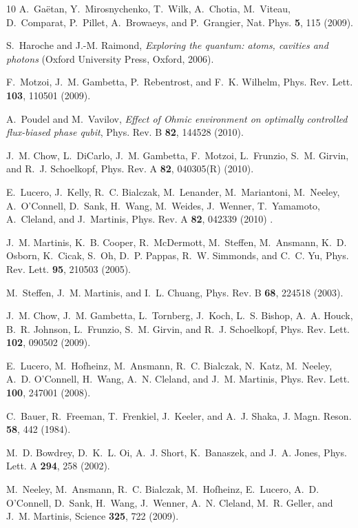 \documentclass[pra,twocolumn,floatfix,superscriptaddress,eqsecnum]{revtex4-1}
\begin{document}
\begin{thebibliography}{10}
A.~Ga\"etan, Y.~Mirosnychenko, T.~Wilk, A.~Chotia, M.~Viteau, D.~Comparat,
  P.~Pillet, A.~Browaeys, and P.~Grangier, Nat. Phys. \textbf{5}, 115 (2009).

S.~Haroche and J.-M. Raimond, \emph{Exploring the quantum: atoms, cavities and
  photons} (Oxford University Press, Oxford, 2006).

F.~Motzoi, J.~M. Gambetta, P.~Rebentrost, and F.~K. Wilhelm, Phys. Rev. Lett.
  \textbf{103}, 110501 (2009).

A.~Poudel and M.~Vavilov, \emph{Effect of Ohmic environment on optimally
  controlled flux-biased phase qubit}, Phys. Rev. B \textbf{82}, 144528 (2010).

J.~M. Chow, L.~DiCarlo, J.~M. Gambetta, F.~Motzoi, L.~Frunzio, S.~M. Girvin,
  and R.~J. Schoelkopf, Phys. Rev. A \textbf{82}, 040305(R) (2010).

E.~Lucero, J.~Kelly, R.~C. Bialczak, M.~Lenander, M.~Mariantoni, M.~Neeley,
  A.~O'Connell, D.~Sank, H.~Wang, M.~Weides, J.~Wenner, T.~Yamamoto,
  A.~Cleland, and J.~Martinis, Phys. Rev. A \textbf{82}, 042339 (2010) .

J.~M. Martinis, K.~B. Cooper, R.~McDermott, M.~Steffen, M.~Ansmann, K.~D.
  Osborn, K.~Cicak, S.~Oh, D.~P. Pappas, R.~W. Simmonds, and C.~C. Yu, Phys.
  Rev. Lett. \textbf{95}, 210503 (2005).

M.~Steffen, J.~M. Martinis, and I.~L. Chuang, Phys. Rev. B \textbf{68}, 224518
  (2003).

J.~M. Chow, J.~M. Gambetta, L.~Tornberg, J.~Koch, L.~S. Bishop, A.~A. Houck,
  B.~R. Johnson, L.~Frunzio, S.~M. Girvin, and R.~J. Schoelkopf, Phys. Rev.
  Lett. \textbf{102}, 090502 (2009).

E.~Lucero, M.~Hofheinz, M.~Ansmann, R.~C. Bialczak, N.~Katz, M.~Neeley, A.~D.
  O'Connell, H.~Wang, A.~N. Cleland, and J.~M. Martinis, Phys. Rev. Lett.
  \textbf{100}, 247001 (2008).

C.~Bauer, R.~Freeman, T.~Frenkiel, J.~Keeler, and A.~J. Shaka, J. Magn. Reson.
  \textbf{58}, 442 (1984).

M.~D. Bowdrey, D.~K.~L. Oi, A.~J. Short, K.~Banaszek, and J.~A. Jones, Phys.
  Lett. A \textbf{294}, 258 (2002).

M.~Neeley, M.~Ansmann, R.~C. Bialczak, M.~Hofheinz, E.~Lucero, A.~D. O'Connell,
  D.~Sank, H.~Wang, J.~Wenner, A.~N. Cleland, M.~R. Geller, and J.~M. Martinis,
  Science \textbf{325}, 722 (2009).


\end{thebibliography}
\end{document}
